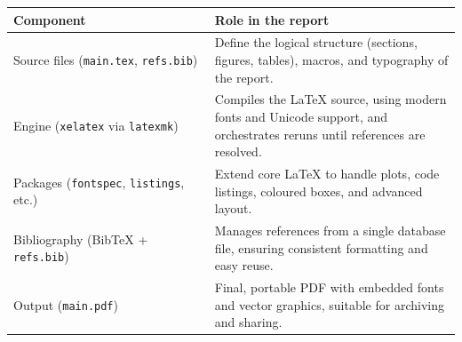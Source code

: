 \medskip
\noindent

\begin{center}
\small
\begin{tabular}{@{}p{0.45\linewidth}p{0.55\linewidth}@{}}
  \toprule
  \textbf{Component} & \textbf{Role in the report} \\
  \midrule
  Source files (\texttt{main.tex}, \texttt{refs.bib}) & Define the logical structure (sections, figures, tables), macros, and typography of the report. \\
  Engine (\texttt{xelatex} via \texttt{latexmk}) & Compiles the \LaTeX{} source, using modern fonts and Unicode support, and orchestrates reruns until references are resolved. \\
  Packages (\texttt{fontspec}, \texttt{listings}, etc.) & Extend core \LaTeX{} to handle plots, code listings, coloured boxes, and advanced layout. \\
  Bibliography (BibTeX + \texttt{refs.bib}) & Manages references from a single database file, ensuring consistent formatting and easy reuse. \\
  Output (\texttt{main.pdf}) & Final, portable PDF with embedded fonts and vector graphics, suitable for archiving and sharing. \\
  \bottomrule
\end{tabular}
\end{center}

